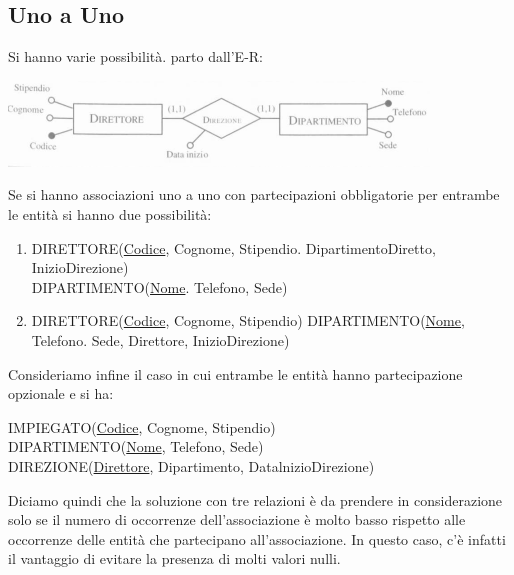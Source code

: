 \documentclass[a4paper,12pt, oneside]{book}
\begin{document}
\subsection{Uno a Uno}
Si hanno varie possibilità. parto dall'E-R:
\begin{center}
\includegraphics[scale=1]{img/erre4.png}
\end{center}
Se si hanno associazioni uno a uno con partecipazioni obbligatorie per entrambe le entità si hanno due possibilità:
\begin{enumerate}
\item
  \begin{center}
  DIRETTORE(\underline{Codice}, Cognome, Stipendio. DipartimentoDiretto, InizioDirezione)\\
  DIPARTIMENTO(\underline{Nome}. Telefono, Sede)
\end{center}
\item
  \begin{center}
  DIRETTORE(\underline{Codice}, Cognome, Stipendio)
  DIPARTIMENTO(\underline{Nome}, Telefono. Sede, Direttore, InizioDirezione)
\end{center}
\end{enumerate}
Consideriamo infine il caso in cui entrambe le entità hanno partecipazione
opzionale e si ha:
\begin{center}
IMPIEGATO(\underline{Codice}, Cognome, Stipendio)\\
DIPARTIMENTO(\underline{Nome}, Telefono, Sede)\\
DIREZIONE(\underline{Direttore}, Dipartimento, DatalnizioDirezione)
\end{center}
Diciamo quindi che la soluzione con tre relazioni è
da prendere in considerazione solo se il numero di occorrenze dell'associazione è
molto basso rispetto alle occorrenze delle entità che partecipano all'associazione.
In questo caso, c'è infatti il vantaggio di evitare la presenza di molti valori nulli.
\end{document}
